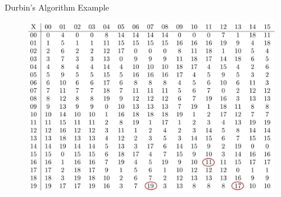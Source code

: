 \documentclass{beamer}
\begin{document}
\begin{frame}{Durbin's Algorithm Example}
{\begin{figure}[H]
      \includegraphics[scale = 0.3]{graph/preftravis.pdf}
    \end{figure}
  }
\end{frame}
\end{document}

